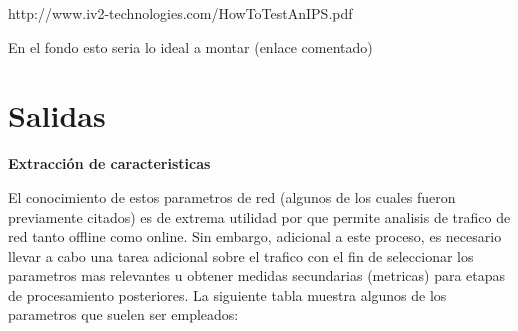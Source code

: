 \documentclass[12pt]{article}
\begin{document}


http://www.iv2-technologies.com/HowToTestAnIPS.pdf

En el fondo esto seria lo ideal a montar (enlace comentado)

\section{Salidas}

\textbf{Extracción de caracteristicas}

El conocimiento de estos parametros de red (algunos de los cuales fueron previamente citados) es de extrema utilidad por que permite analisis de trafico de red tanto offline como online. Sin embargo, adicional a este proceso, es necesario llevar a cabo una tarea adicional sobre el trafico con el fin de seleccionar los parametros mas relevantes u obtener medidas secundarias (metricas) para etapas de procesamiento posteriores. La siguiente tabla muestra algunos de los parametros que suelen ser empleados:
\end{document}
